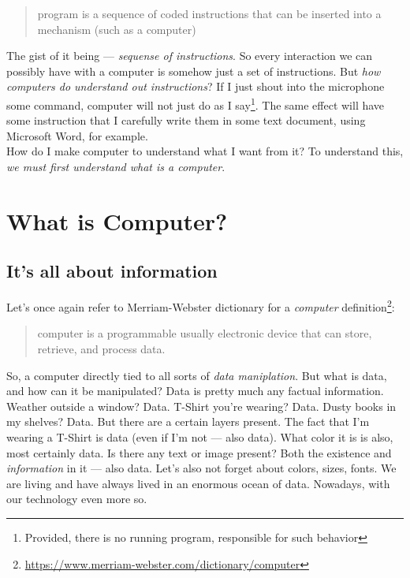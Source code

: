 \documentclass{article}
\begin{document}
        \begin{quote}
            program is a sequence of coded instructions that can be inserted into a mechanism (such as a computer)
        \end{quote}

        The gist of it being --- \emph{sequense of instructions}. So every interaction we can possibly have with a computer is somehow just a set of instructions. But \emph{how computers
        do understand out instructions}? If I just shout into the microphone some command, computer will not just do as I say\footnote{Provided, there is no running program, responsible for such behavior}.
        The same effect will have some instruction that I carefully write them in some text document, using Microsoft Word, for example.
        \\ 
        How do I make computer to understand what I want from it? To understand this, \emph{we must first understand what is a computer}.
        \newpage
    \section{What is Computer?}

        \subsection{It's all about information}
            Let's once again refer to Merriam-Webster dictionary for a \emph{computer} definition\footnote{\href{https://www.merriam-webster.com/dictionary/computer}{https://www.merriam-webster.com/dictionary/computer}}:

            \begin{quote}
                computer is a programmable usually electronic device that can store, retrieve, and process data.
            \end{quote}

            So, a computer directly tied to all sorts of \emph{data maniplation}. But what is data, and how can it be manipulated? Data is pretty much any factual information.
            Weather outside a window? Data. T-Shirt you're wearing? Data. Dusty books in my shelves? Data. But there are a certain layers present. The fact that I'm wearing a T-Shirt 
            is data (even if I'm not --- also data). What color it is is also, most certainly data. Is there any text or image present?
            Both the existence and \emph{information} in it --- also data. Let's also not forget about colors, sizes, fonts. We are living and have always lived in an enormous ocean of data. Nowadays, with our technology even more so. \par
            
\end{document}
